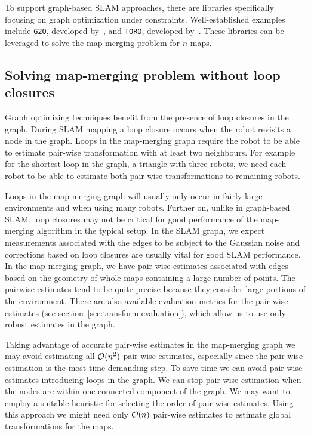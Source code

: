 To support graph-based \gls{SLAM} approaches, there are libraries specifically focusing on graph optimization under constraints. Well-established examples include \texttt{G2O}, developed by~\citet{kummerle2011g2o}, and \texttt{TORO}, developed by~\citet{grisetti2007toro}. These libraries can be leveraged to solve the map-merging problem for $n$ maps.

\subsection{Solving map-merging problem without loop closures}

Graph optimizing techniques benefit from the presence of loop closures in the graph. During \gls{SLAM} mapping a loop closure occurs when the robot revisits a node in the graph. Loops in the map-merging graph require the robot to be able to estimate pair-wise transformation with at least two neighbours. For example for the shortest loop in the graph, a triangle with three robots, we need each robot to be able to estimate both pair-wise transformations to remaining robots.

Loops in the map-merging graph will usually only occur in fairly large environments and when using many robots. Further on, unlike in graph-based \gls{SLAM}, loop closures may not be critical for good performance of the map-merging algorithm in the typical setup. In the \gls{SLAM} graph, we expect measurements associated with the edges to be subject to the Gaussian noise and corrections based on loop closures are usually vital for good \gls{SLAM} performance. In the map-merging graph, we have pair-wise estimates associated with edges based on the geometry of whole maps containing a large number of points. The pairwise estimates tend to be quite precise because they consider large portions of the environment. There are also available evaluation metrics for the pair-wise estimates (see section~\ref{sec:transform-evaluation}), which allow us to use only robust estimates in the graph.

Taking advantage of accurate pair-wise estimates in the map-merging graph we may avoid estimating all $\operatorname{\mathcal{O}}(n^2)$ pair-wise estimates, especially since the pair-wise estimation is the most time-demanding step. To save time we can avoid pair-wise estimates introducing loops in the graph. We can stop pair-wise estimation when the nodes are within one connected component of the graph. We may want to employ a suitable heuristic for selecting the order of pair-wise estimates. Using this approach we might need only $\operatorname{\mathcal{O}}(n)$ pair-wise estimates to estimate global transformations for the maps.

